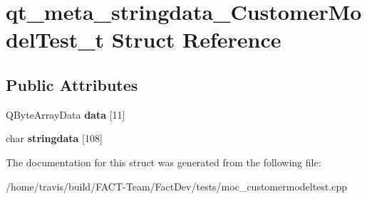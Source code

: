 \hypertarget{structqt__meta__stringdata__CustomerModelTest__t}{\section{qt\-\_\-meta\-\_\-stringdata\-\_\-\-Customer\-Model\-Test\-\_\-t Struct Reference}
\label{structqt__meta__stringdata__CustomerModelTest__t}
}
\subsection*{Public Attributes}
\begin{DoxyCompactItemize}
\item 
\hypertarget{structqt__meta__stringdata__CustomerModelTest__t_a7e8d7fe42cd5073e9ccb9c415e4c1bda}{Q\-Byte\-Array\-Data {\bfseries data} \mbox{[}11\mbox{]}}\label{structqt__meta__stringdata__CustomerModelTest__t_a7e8d7fe42cd5073e9ccb9c415e4c1bda}

\item 
\hypertarget{structqt__meta__stringdata__CustomerModelTest__t_a5079c514f58ff5be0a0dd8c96374ae8f}{char {\bfseries stringdata} \mbox{[}108\mbox{]}}\label{structqt__meta__stringdata__CustomerModelTest__t_a5079c514f58ff5be0a0dd8c96374ae8f}

\end{DoxyCompactItemize}


The documentation for this struct was generated from the following file\-:\begin{DoxyCompactItemize}
\item 
/home/travis/build/\-F\-A\-C\-T-\/\-Team/\-Fact\-Dev/tests/moc\-\_\-customermodeltest.\-cpp\end{DoxyCompactItemize}
